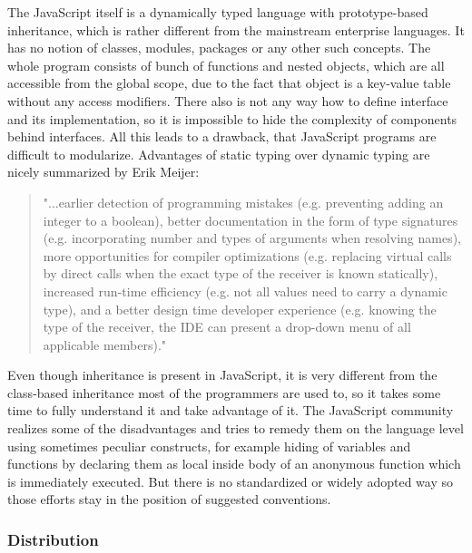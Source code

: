 \documentclass[12pt,a4paper]{report}
\begin{document}
The JavaScript itself is a dynamically typed language with prototype-based inheritance, which is rather different from the mainstream enterprise languages. It has no notion of classes, modules, packages or any other such concepts. The whole program consists of bunch of functions and nested objects, which are all accessible from the global scope, due to the fact that object is a key-value table without any access modifiers. There also is not any way how to define interface and its implementation, so it is impossible to hide the complexity of components behind interfaces. All this leads to a drawback, that JavaScript programs are difficult to modularize. Advantages of static typing over dynamic typing are nicely summarized by Erik Meijer\cite{Meijer}: 

\begin{quote}
"...earlier detection of programming mistakes (e.g. preventing adding an integer to a boolean), better documentation in the form of type signatures (e.g. incorporating number and types of arguments when resolving names), more opportunities for compiler optimizations (e.g. replacing virtual calls by direct calls when the exact type of the receiver is known statically), increased run-time efficiency (e.g. not all values need to carry a dynamic type), and a better design time developer experience (e.g. knowing the type of the receiver, the IDE can present a drop-down menu of all applicable members)."
\end{quote}

Even though inheritance is present in JavaScript, it is very different from the class-based inheritance most of the programmers are used to, so it takes some time to fully understand it and take advantage of it. The JavaScript community realizes some of the disadvantages and tries to remedy them on the language level using sometimes peculiar constructs, for example hiding of variables and functions by declaring them as local inside body of an anonymous function which is immediately executed. But there is no standardized or widely adopted way so those efforts stay in the position of suggested conventions.

\subsubsection*{Distribution} 
\end{document}
